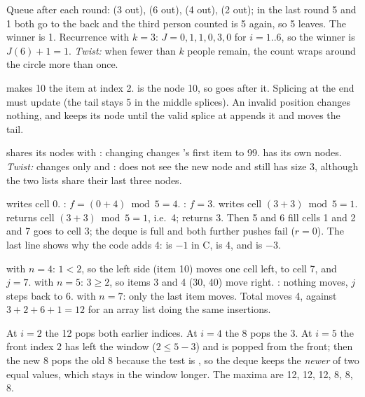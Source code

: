 Queue after each round: \cc{[4 5 6 1 2]} (3 out), \cc{[1 2 4 5]} (6 out),
\cc{[5 1 2]} (4 out), \cc{[5 1]} (2 out); in the last round 5 and 1 both go to the back
and the third person counted is 5 again, so 5 leaves. The winner is 1. Recurrence with $k=3$: $J=0,1,1,0,3,0$ for
$i=1..6$, so the winner is $J(6)+1=1$. \emph{Twist:} when fewer than $k$ people remain,
the count wraps around the circle more than once.

 makes 10 the item at index 2.  is the node
10, so  goes after it. Splicing at the end must update  (the tail
stays 5 in the middle splices). An invalid position changes nothing, and  keeps
its node until the valid splice at  appends it and moves the tail.

 shares its nodes with : changing  changes
's first item to 99.  has its own nodes. \emph{Twist:}
 changes only  and :  does not see
the new node and still has size 3, although the two lists share their last three nodes.

 writes cell 0. : $f=(0+4)\bmod5=4$. :
$f=3$.  writes cell $(3+3)\bmod5=1$.  returns cell
$(3+3)\bmod5=1$, i.e.\ 4;  returns 3. Then 5 and 6 fill cells 1 and 2 and
7 goes to cell 3; the deque is full and both further pushes fail ($r=0$). The last line
shows why the code adds 4:  is $-1$ in C,  is 4, and
 is $-3$.

 with $n=4$: $1<2$, so the left side (item 10) moves one cell left, to cell
7, and $j=7$.  with $n=5$: $3\ge2$, so items 3 and 4 (30, 40) move right.
: nothing moves, $j$ steps back to 6.  with $n=7$: only the
last item moves. Total moves 4, against $3+2+6+1=12$ for an array list doing the same
insertions.

At $i=2$ the 12 pops both earlier indices. At $i=4$ the 8 pops the 3. At $i=5$ the front
index 2 has left the window ($2\le5-3$) and is popped from the front; then the new 8 pops
the old 8 because the test is \cc{<=}, so the deque keeps the \emph{newer} of two equal
values, which stays in the window longer. The maxima are 12, 12, 12, 8, 8, 8.

